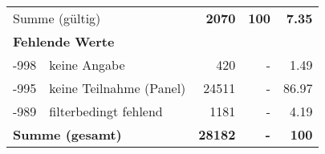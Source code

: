 \begin{longtable}{lXrrr}
     \midrule
     \multicolumn{2}{l}{Summe (gültig)} &
       \textbf{\num{2070}} &
     \textbf{\num{100}} &
       \textbf{\num[round-mode=places,round-precision=2]{7.35}} \\
     \multicolumn{5}{l}{\textbf{Fehlende Werte}}\\
       -998 &
       keine Angabe &
         \num{420} &
        - &
         \num[round-mode=places,round-precision=2]{1.49} \\
       -995 &
       keine Teilnahme (Panel) &
         \num{24511} &
        - &
         \num[round-mode=places,round-precision=2]{86.97} \\
       -989 &
       filterbedingt fehlend &
         \num{1181} &
        - &
         \num[round-mode=places,round-precision=2]{4.19} \\
     \midrule
     \multicolumn{2}{l}{\textbf{Summe (gesamt)}} &
          \textbf{\num{28182}} &
        \textbf{-} &
        \textbf{\num{100}} \\
     \bottomrule
     \end{longtable}
     
